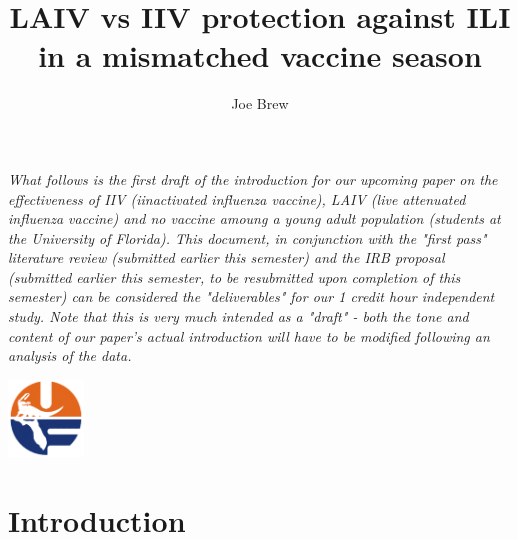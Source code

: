 \documentclass[11pt]{article}
\begin{document}


\title{\textbf{LAIV vs IIV protection against ILI in a mismatched vaccine season }}
\author{Joe Brew}


\maketitle

\emph{What follows is the first draft of the introduction for our upcoming paper on the effectiveness of IIV (iinactivated influenza vaccine), LAIV (live attenuated influenza vaccine) and no vaccine amoung a young adult population (students at the University of Florida).  This document, in conjunction with the "first pass" literature review (submitted earlier this semester) and the IRB proposal (submitted earlier this semester, to be resubmitted upon completion of this semester) can be considered the "deliverables" for our 1 credit hour independent study. Note that this is very much intended as a "draft" - both the tone and content of our paper's actual introduction will have to be modified following an analysis of the data.}
\tableofcontents

\vspace{20mm}

\begin{center}
\includegraphics[width=2cm]{uf}
\end{center}




\section*{Introduction}
\hrulefill
\end{document}
